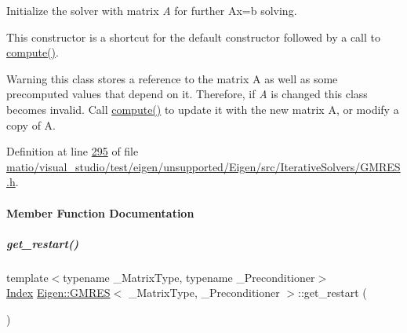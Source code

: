 Initialize the solver with matrix {\itshape A} for further {\ttfamily Ax=b} solving.

This constructor is a shortcut for the default constructor followed by a call to \hyperlink{group___iterative_linear_solvers___module_a7dfa55c55e82d697bde227696a630914}{compute()}.

\begin{DoxyWarning}{Warning}
this class stores a reference to the matrix A as well as some precomputed values that depend on it. Therefore, if {\itshape A} is changed this class becomes invalid. Call \hyperlink{group___iterative_linear_solvers___module_a7dfa55c55e82d697bde227696a630914}{compute()} to update it with the new matrix A, or modify a copy of A. 
\end{DoxyWarning}


Definition at line \hyperlink{matio_2visual__studio_2test_2eigen_2unsupported_2_eigen_2src_2_iterative_solvers_2_g_m_r_e_s_8h_source_l00295}{295} of file \hyperlink{matio_2visual__studio_2test_2eigen_2unsupported_2_eigen_2src_2_iterative_solvers_2_g_m_r_e_s_8h_source}{matio/visual\+\_\+studio/test/eigen/unsupported/\+Eigen/src/\+Iterative\+Solvers/\+G\+M\+R\+E\+S.\+h}.



\paragraph{Member Function Documentation}
\mbox{\label{group___iterative_linear_solvers___module_ade721328e58ace2d4493cbdcbe53ad09}} 
\subparagraph{\texorpdfstring{get\+\_\+restart()}{get\_restart()}\hspace{0.1cm}{\footnotesize\ttfamily [1/2]}}
{\footnotesize\ttfamily template$<$typename \+\_\+\+Matrix\+Type, typename \+\_\+\+Preconditioner$>$ \\
\hyperlink{namespace_eigen_a62e77e0933482dafde8fe197d9a2cfde}{Index} \hyperlink{group___iterative_linear_solvers___module_class_eigen_1_1_g_m_r_e_s}{Eigen\+::\+G\+M\+R\+ES}$<$ \+\_\+\+Matrix\+Type, \+\_\+\+Preconditioner $>$\+::get\+\_\+restart (\begin{DoxyParamCaption}{ }\end{DoxyParamCaption})\hspace{0.3cm}{\ttfamily [inline]}}

